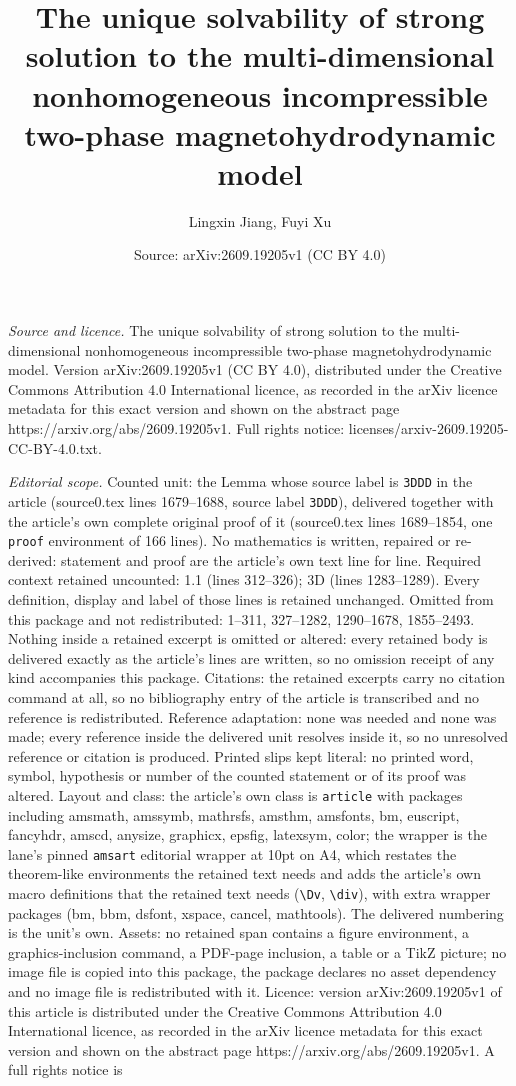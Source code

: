 \documentclass[10pt,a4paper]{amsart}
\title[The unique solvability of strong solution to the multi-dimen]{The unique solvability of strong solution to the multi-dimensional nonhomogeneous incompressible two-phase magnetohydrodynamic model}
\author{Lingxin Jiang, Fuyi Xu}
\date{Source: arXiv:2609.19205v1 (CC BY 4.0)}
\begin{document}
\maketitle

\noindent\emph{Source and licence.} The unique solvability of strong solution to the multi-dimensional nonhomogeneous incompressible two-phase magnetohydrodynamic model. Version arXiv:2609.19205v1 (CC BY 4.0), distributed under the Creative Commons Attribution 4.0 International licence, as recorded in the arXiv licence metadata for this exact version and shown on the abstract page https://arxiv.org/abs/2609.19205v1. Full rights notice: licenses/arxiv-2609.19205-CC-BY-4.0.txt.\par\smallskip

\noindent\textit{Editorial scope.} Counted unit: the Lemma whose source label is \texttt{3DDD} in the article (source0.tex lines 1679--1688, source label \texttt{3DDD}), delivered together with the article's own complete original proof of it (source0.tex lines 1689--1854, one \texttt{proof} environment of 166 lines). No mathematics is written, repaired or re-derived: statement and proof are the article's own text line for line. Required context retained uncounted: 1.1 (lines 312--326); 3D (lines 1283--1289). Every definition, display and label of those lines is retained unchanged. Omitted from this package and not redistributed: 1--311, 327--1282, 1290--1678, 1855--2493. Nothing inside a retained excerpt is omitted or altered: every retained body is delivered exactly as the article's lines are written, so no omission receipt of any kind accompanies this package. Citations: the retained excerpts carry no citation command at all, so no bibliography entry of the article is transcribed and no reference is redistributed. Reference adaptation: none was needed and none was made; every reference inside the delivered unit resolves inside it, so no unresolved reference or citation is produced. Printed slips kept literal: no printed word, symbol, hypothesis or number of the counted statement or of its proof was altered. Layout and class: the article's own class is \texttt{article} with packages including amsmath, amssymb, mathrsfs, amsthm, amsfonts, bm, euscript, fancyhdr, amscd, anysize, graphicx, epsfig, latexsym, color; the wrapper is the lane's pinned \texttt{amsart} editorial wrapper at 10pt on A4, which restates the theorem-like environments the retained text needs and adds the article's own macro definitions that the retained text needs (\texttt{\textbackslash Dv}, \texttt{\textbackslash div}), with extra wrapper packages (bm, bbm, dsfont, xspace, cancel, mathtools). The delivered numbering is the unit's own. Assets: no retained span contains a figure environment, a graphics-inclusion command, a PDF-page inclusion, a table or a TikZ picture; no image file is copied into this package, the package declares no asset dependency and no image file is redistributed with it. Licence: version arXiv:2609.19205v1 of this article is distributed under the Creative Commons Attribution 4.0 International licence, as recorded in the arXiv licence metadata for this exact version and shown on the abstract page https://arxiv.org/abs/2609.19205v1. A full rights notice is 
\end{document}
